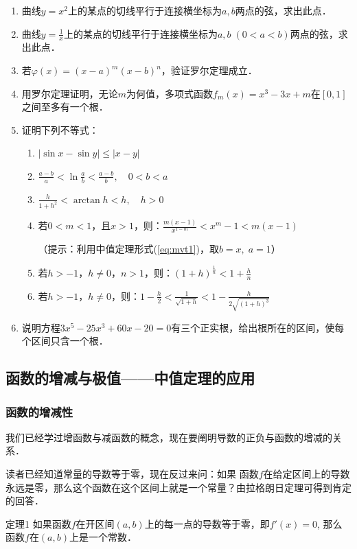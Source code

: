 \begin{ex}
\begin{enumerate}
    \item 曲线$y=x^2$上的某点的切线平行于连接横坐标为$a,b$两点的弦，求出此点．
    \item 曲线$y=\frac{1}{x}$上的某点的切线平行于连接横坐标为$a,b\;(0<a<b)$两点的弦，求出此点．
    \item 若$\varphi(x)=(x-a)^m(x-b)^n$，验证罗尔定理成立．
    \item 用罗尔定理证明，无论$m$为何值，多项式函数$f_m(x)=x^3-3x+m$在$[0, 1]$之间至多有一个根．
    \item 证明下列不等式：
\begin{enumerate}
    \item $|\sin x-\sin y|\le |x-y|$
    \item $\frac{a-b}{a}<\ln \frac{a}{b}<\frac{a-b}{b},\quad 0<b<a$
    \item $\frac{h}{1+h^2}<\arctan h<h,\quad h>0$
    \item 若$0<m<1$，且$x>1$，则：$\frac{m(x-1)}{x^{1-m}}<x^m-1<m(x-1)$
    
    （提示：利用中值定理形式(\ref{eq:mvt1})，取$b=x,\; a=1$）
    \item 若$h>-1$，$h\ne 0$，$n>1$，则：$(1+h)^{\tfrac{1}{n}}<1+\frac{h}{n}$
    \item 若$h>-1$，$h\ne 0$，则：$1-\frac{h}{2}<\frac{1}{\sqrt{1+h}}<1-\frac{h}{2\sqrt{(1+h)^3}}$
\end{enumerate}
\item 说明方程$3x^5-25x^3+60x-20=0$有三个正实根，给出根所在的区间，使每个区间只含一个根．
\end{enumerate}
\end{ex}

\subsection{函数的增减与极值——中值定理的应用}

\subsubsection{函数的增减性}

我们已经学过增函数与减函数的概念，现在要阐明导数的正负与函数的增减的关系．

读者已经知道常量的导数等于零，现在反过来问：如果
函数$f$在给定区间上的导数永远是零，那么这个函数在这个区间上就是一个常量？由拉格朗日定理可得到肯定的回答．

\begin{blk}
  {定理1} 如果函数$f$在开区间$(a,b)$上的每一点的导数等于零，即$f'(x)=0$, 那么函数$f$在$(a,b)$上是一个常数．  
\end{blk}

